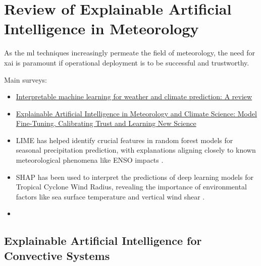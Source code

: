 
\section{Review of Explainable Artificial Intelligence in Meteorology}

As the \acrshort{ml} techniques increasingly permeate the field of meteorology, the need for \acrshort{xai} is paramount if operational deployment is to be successful and trustworthy.

Main surveys:
\begin{itemize}
    \item \href{https://www.sciencedirect.com/science/article/pii/S1352231024004722}{Interpretable machine learning for weather and climate prediction: A review}
    \item \href{https://link.springer.com/chapter/10.1007/978-3-031-04083-2_16#Sec2}{Explainable Artificial Intelligence in Meteorology and Climate Science: Model Fine-Tuning, Calibrating Trust and Learning New Science}
\end{itemize}

\begin{itemize}
    \item LIME has helped identify crucial features in random forest models for seasonal precipitation prediction, with explanations aligning closely to known meteorological phenomena like ENSO impacts .
    \item SHAP has been used to interpret the predictions of deep learning models for Tropical Cyclone Wind Radius, revealing the importance of environmental factors like sea surface temperature and vertical wind shear .
    \item 
\end{itemize}

\subsection{Explainable Artificial Intelligence for Convective Systems}

